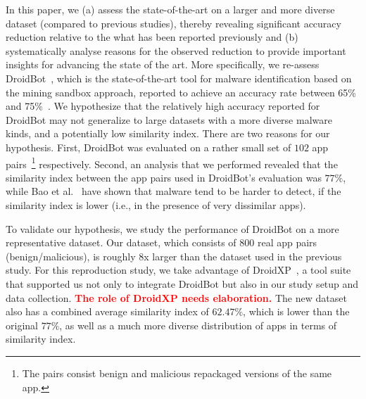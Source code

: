 In this paper, we (a) assess the state-of-the-art on a larger and more diverse dataset (compared to previous studies),
thereby revealing significant accuracy reduction relative to the what has been reported previously and 
(b) systematically analyse reasons for the observed reduction to provide important insights for 
advancing the state of the art.
%
More specifically, we re-assess DroidBot~\cite{DBLP:conf/wcre/BaoLL18,DBLP:journals/jss/CostaMMSSBNR22}, 
which is the state-of-the-art 
tool for malware identification based on the mining sandbox approach,
reported to achieve an accuracy rate between 65\% and 75\%~\cite{DBLP:conf/wcre/BaoLL18,DBLP:journals/jss/CostaMMSSBNR22}. 
 We hypothesize that the relatively high accuracy reported for DroidBot 
may not generalize to large datasets with a more diverse malware kinds, and a potentially low similarity index.
There are two reasons for our hypothesis. First, DroidBot was evaluated on a rather small set of $102$ app pairs~\footnote{The pairs consist benign and malicious repackaged versions of the same app.} respectively. 
Second, an analysis that we performed revealed that the similarity index between the app pairs used in DroidBot's evaluation was $77\%$, while Bao et al.~\cite{DBLP:conf/iceccs/LeB0GL18} %
have shown that malware tend to be harder to detect, if the similarity index is lower 
(i.e., in the presence of very dissimilar apps). 

To validate our hypothesis, we study the performance of DroidBot on a more representative dataset. 
Our dataset, which consists of $800$ real app pairs (benign/malicious), is 
roughly 8x larger than the dataset used in the previous study. 
For this reproduction study, we take advantage of DroidXP~\cite{DBLP:conf/scam/CostaMCMVBC20}, a tool suite that supported us not only to integrate DroidBot but also in our study setup and data collection. \textcolor{red}{\textbf{The role of DroidXP needs elaboration.}} The new dataset also has a combined average similarity index of $62.47\%$, which is lower than the original $77\%$, 
as well as a much more diverse distribution of apps in terms of similarity index. 

